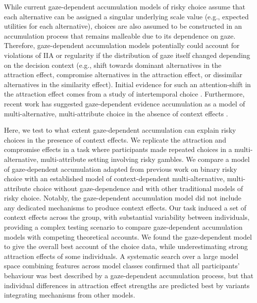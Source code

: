 \documentclass[11pt, a4paper]{article}
\begin{document}
While current gaze-dependent accumulation models of risky choice assume that each alternative can be assigned a singular underlying scale value (e.g., expected utilities for each alternative), choices are also assumed to be constructed in an accumulation process that remains malleable due to its dependence on gaze. Therefore, gaze-dependent accumulation models potentially could account for violations of IIA or regularity if the distribution of gaze itself changed depending on the decision context (e.g., shift towards dominant alternatives in the attraction effect, compromise alternatives in the attraction effect, or dissimilar alternatives in the similarity effect). Initial evidence for such an attention-shift in the attraction effect comes from a study of intertemporal choice \parencite{marini2020AttractionComesMany}. Furthermore, recent work has suggested gaze-dependent evidence accumulation as a model of multi-alternative, multi-attribute choice in the absence of context effects \parencite{cohen2017MultiattributeMultialternativeModels,gluth2018ValuebasedAttentionalCapture}.

Here, we test to what extent gaze-dependent accumulation can explain risky choices in the presence of context effects. We replicate the attraction and compromise effects in a task where participants made repeated choices in a multi-alternative, multi-attribute setting involving risky gambles. We compare a model of gaze-dependent accumulation adapted from previous work on binary risky choice \parencite{glickman2019FormationPreferenceRisky} with an established model of context-dependent multi-alternative, multi-attribute choice without gaze-dependence and with other traditional models of risky choice. Notably, the gaze-dependent accumulation model did not include any dedicated mechanisms to produce context effects. Our task induced a set of context effects across the group, with substantial variability between individuals, providing a complex testing scenario to compare gaze-dependent accumulation models with competing theoretical accounts. We found the gaze-dependent model to give the overall best account of the choice data, while underestimating strong attraction effects of some individuals. A systematic search over a large model space combining features across model classes confirmed that all participants’ behaviour was best described by a gaze-dependent accumulation process, but that individual differences in attraction effect strengths are predicted best by variants integrating mechanisms from other models.
\end{document}
